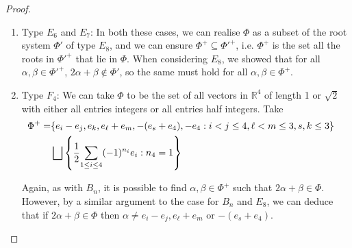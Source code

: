 \documentclass[12pt,a4paper]{article}
\let\\=\cr
\theoremstyle{definition}
\theoremstyle{remark}
\theoremstyle{custthm}
\begin{document}
\begin{proof}
\begin{enumerate}
    If the $e_8$ coefficient of $\alpha$ is $-\frac{1}{2}$, then $$\alpha=\frac{1}{2}\underset{1\leq i\leq 8}{\sum}(-1)^{n_i}e_i$$ so $2\alpha=\underset{1\leq i\leq 8}{\sum}(-1)^{n_i}e_i$ has $e_i$ coefficient $-1$. So if $2\alpha+\beta\in\Phi^+$ then the $e_8$ coefficient of $\beta$ is zero, so $\beta=\pm e_i\pm e_j$ for some $i\neq j$. Therefore, $2\alpha+\beta$ has at least 5 non-zero $e_k$-coefficients, and these coefficients are not $\pm\frac{1}{2}$, so $2\alpha+\beta\notin\Phi^+$ -- contradiction.\\

    Finally, if $\alpha$ has $e_8$ coefficient 0, then $2\alpha=\pm2e_k\pm2e_\ell$, so for any $\beta$ of the form $\frac{1}{2}\underset{1\leq i\leq 8}{\sum}(-1)^{n_i}e_i$, $2\alpha+\beta$ has $e_k$-entry either $-2.5,-1.5,1.5$ or $2.5$, so $2\alpha+\beta\notin\Phi$. Therefore, we may assume that $\alpha$ and $\beta$ have $e_8$ coefficient 0, and hence they lie in a positive system of type $D_7$, so the previous argument shows that $2\alpha+\beta\notin\Phi^+$ as required.

    \item Type $E_6$ and $E_7$: In both these cases, we can realise $\Phi$ as a subset of the root system $\Phi'$ of type $E_8$, and we can ensure $\Phi^+\subseteq\Phi'^+$, i.e. $\Phi^+$ is the set all the roots in $\Phi'^+$ that lie in $\Phi$. When considering $E_8$, we showed that for all $\alpha,\beta\in\Phi'^+$, $2\alpha+\beta\notin\Phi'$, so the same must hold for all $\alpha,\beta\in\Phi^+$.

    \item Type $F_4$: We can take $\Phi$ to be the set of all vectors in $\mathbb{R}^4$ of length 1 or $\sqrt{2}$ with either all entries integers or all entries half integers. Take
    \begin{align*}
    \Phi^+=&\{e_i-e_j,e_k,e_\ell+e_m,-(e_s+e_4),-e_4:i<j\leq 4,\ell<m\leq 3,s,k\leq 3\}\\&\bigsqcup\left\{\frac{1}{2}\underset{1\leq i\leq 4}{\sum}(-1)^{n_i}e_i:n_4=1\right\}
    \end{align*}

    Again, as with $B_n$, it is possible to find $\alpha,\beta\in\Phi^+$ such that $2\alpha+\beta\in\Phi$. However, by a similar argument to the case for $B_n$ and $E_8$, we can deduce that if $2\alpha+\beta\in\Phi$ then $\alpha\neq e_i-e_j,e_\ell+e_m$ or $-(e_s+e_4)$.

    

\end{enumerate}
\end{proof}
\end{document}
